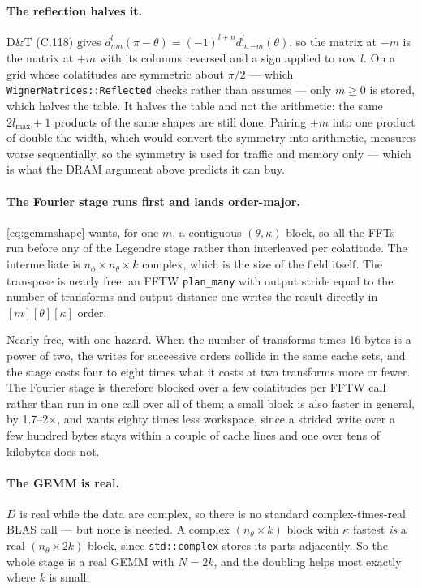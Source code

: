 \documentclass[11pt,a4paper]{article}
\newcommand{\code}[1]{\texttt{#1}}
\begin{document}
\paragraph{The reflection halves it.}  D\&T (C.118) gives
$d^l_{nm}(\pi-\theta) = (-1)^{l+n} d^l_{n,-m}(\theta)$, so the matrix at
$-m$ is the matrix at $+m$ with its columns reversed and a sign applied to
row $l$.  On a grid whose colatitudes are symmetric about $\pi/2$ ---
which \code{WignerMatrices::Reflected} checks rather than assumes --- only
$m\geq 0$ is stored, which halves the table.  It halves the table and not
the arithmetic: the same $2l_{\max}+1$ products of the same shapes are
still done.  Pairing $\pm m$ into one product of double the width, which
would convert the symmetry into arithmetic, measures worse sequentially,
so the symmetry is used for traffic and memory only --- which is what the
DRAM argument above predicts it can buy.

\paragraph{The Fourier stage runs first and lands order-major.}
\eqref{eq:gemmshape} wants, for one $m$, a contiguous $(\theta,\kappa)$
block, so all the FFTs run before any of the Legendre stage rather than
interleaved per colatitude.  The intermediate is $n_\phi \times n_\theta
\times k$ complex, which is the size of the field itself.  The transpose
is nearly free: an FFTW \code{plan\_many} with output stride equal to the
number of transforms and output distance one writes the result directly
in $[m][\theta][\kappa]$ order.

Nearly free, with one hazard.  When the number of transforms times 16
bytes is a power of two, the writes for successive orders collide in the
same cache sets, and the stage costs four to eight times what it costs at
two transforms more or fewer.  The Fourier stage is therefore blocked over
a few colatitudes per FFTW call rather than run in one call over all of
them; a small block is also faster in general, by 1.7--2$\times$, and
wants eighty times less workspace, since a strided write over a few
hundred bytes stays within a couple of cache lines and one over tens of
kilobytes does not.

\paragraph{The GEMM is real.}  $D$ is real while the data are complex, so
there is no standard complex-times-real BLAS call --- but none is needed.
A complex $(n_\theta \times k)$ block with $\kappa$ fastest \emph{is} a
real $(n_\theta \times 2k)$ block, since \code{std::complex} stores its
parts adjacently.  So the whole stage is a real GEMM with $N = 2k$, and the
doubling helps most exactly where $k$ is small.
\end{document}
